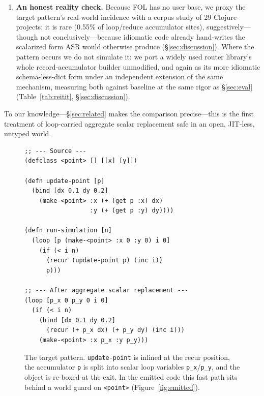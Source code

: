 \documentclass[sigplan,screen,review,anonymous]{acmart}
\begin{document}
\begin{enumerate}
  technique reduces per-iteration allocation to zero for an end-to-end
  3.1$\times$--16.3$\times$ speedup (dominated by one dispatch-bound benchmark,
  \S\ref{sec:eval}; the rest span 3.1$\times$--7.0$\times$), produces byte-identical results, and adds no
  cost when disabled or inapplicable. We also measure a native
  mutable-\texttt{defstruct} implementation of each benchmark as an upper bound,
  reporting how much of the gap ASR closes and what the residual is
  (\S\ref{sec:eval}).
  \item \textbf{An honest reality check.} Because FOL has no user base, we
  proxy the target pattern's real-world incidence with a corpus study of 29
  Clojure projects: it is rare (0.55\% of loop/reduce accumulator sites),
  suggestively---though not conclusively---because idiomatic code already
  hand-writes the scalarized form ASR would otherwise produce
  (\S\ref{sec:discussion}). Where the pattern occurs we do not simulate
  it: we port a widely used router library's whole record-accumulator
  builder unmodified, and again as its more idiomatic schema-less-dict
  form under an independent extension of the same mechanism, measuring
  both against baseline at the same rigor as \S\ref{sec:eval}
  (Table~\ref{tab:reitit}, \S\ref{sec:discussion}).
\end{enumerate}

To our knowledge---\S\ref{sec:related} makes the comparison
precise---this is the first treatment of loop-carried aggregate scalar
replacement safe in an open, JIT-less, untyped world.

\begin{figure}
\begin{lstlisting}
;; --- Source ---
(defclass <point> [] [[x] [y]])

(defn update-point [p]
  (bind [dx 0.1 dy 0.2]
    (make-<point> :x (+ (get p :x) dx)
                  :y (+ (get p :y) dy))))

(defn run-simulation [n]
  (loop [p (make-<point> :x 0 :y 0) i 0]
    (if (< i n)
      (recur (update-point p) (inc i))
      p)))

;; --- After aggregate scalar replacement ---
(loop [p_x 0 p_y 0 i 0]
  (if (< i n)
    (bind [dx 0.1 dy 0.2]
      (recur (+ p_x dx) (+ p_y dy) (inc i)))
    (make-<point> :x p_x :y p_y)))
\end{lstlisting}
\caption{The target pattern. \texttt{update-point} is inlined at the recur
position, the accumulator \texttt{p} is split into scalar loop variables
\texttt{p\_x}/\texttt{p\_y}, and the object is re-boxed at the exit. In
the emitted code this fast path sits behind a world guard on \texttt{<point>}
(Figure~\ref{fig:emitted}).}
\label{fig:overview}
\end{figure}
\end{document}
